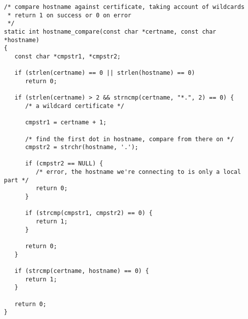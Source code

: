 \begin{verbatim}
/* compare hostname against certificate, taking account of wildcards
 * return 1 on success or 0 on error 
 */
static int hostname_compare(const char *certname, const char *hostname)
{
   const char *cmpstr1, *cmpstr2;

   if (strlen(certname) == 0 || strlen(hostname) == 0)
      return 0;

   if (strlen(certname) > 2 && strncmp(certname, "*.", 2) == 0) {
      /* a wildcard certificate */

      cmpstr1 = certname + 1;

      /* find the first dot in hostname, compare from there on */
      cmpstr2 = strchr(hostname, '.');

      if (cmpstr2 == NULL) {
         /* error, the hostname we're connecting to is only a local part */
         return 0;
      }

      if (strcmp(cmpstr1, cmpstr2) == 0) {
         return 1;
      }

      return 0;
   }

   if (strcmp(certname, hostname) == 0) {
      return 1;
   }

   return 0;
}

\end{verbatim}
